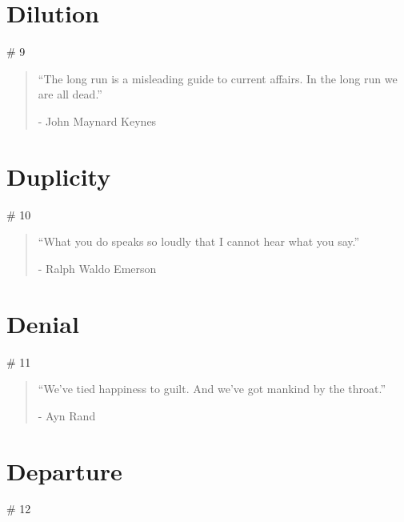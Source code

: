 \chapter{Dilution} # 9

\vspace{-1.3cm}
\begin{localsize}{10}
	\begin{quote}
		“The long run is a misleading guide to current affairs. In the long run we are all dead.” 
		\begin{flushright}- John Maynard Keynes \end{flushright}
	\end{quote} 
\end{localsize}
\vspace{1cm}

\chapter{Duplicity} # 10

\vspace{-1.3cm}
\begin{localsize}{10}
	\begin{quote}
		“What you do speaks so loudly that I cannot hear what you say.”
		\begin{flushright}- Ralph Waldo Emerson \end{flushright}
	\end{quote} 
\end{localsize}
\vspace{1cm}

\chapter{Denial} # 11

\vspace{-1.3cm}
\begin{localsize}{10}
  \begin{quote}
    “We've tied happiness to guilt. And we've got mankind by the throat.”
    \begin{flushright}- Ayn Rand \end{flushright}
  \end{quote} 
\end{localsize}
\vspace{1cm}


\chapter{Departure} # 12


